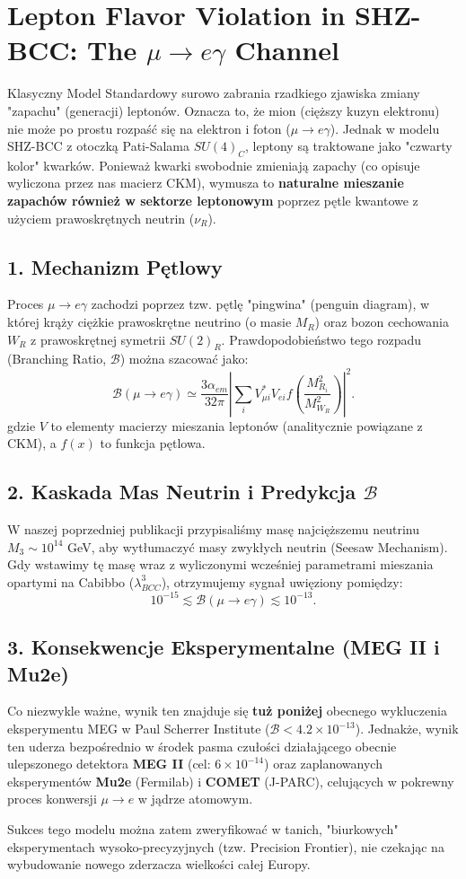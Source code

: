 \documentclass[11pt,a4paper]{article}
\begin{document}
\section*{Lepton Flavor Violation in SHZ-BCC: The $\mu \to e \gamma$ Channel}

Klasyczny Model Standardowy surowo zabrania rzadkiego zjawiska zmiany "zapachu" (generacji) leptonów. Oznacza to, że mion (cięższy kuzyn elektronu) nie może po prostu rozpaść się na elektron i foton ($\mu \to e \gamma$). 
Jednak w modelu SHZ-BCC z otoczką Pati-Salama $SU(4)_C$, leptony są traktowane jako "czwarty kolor" kwarków. Ponieważ kwarki swobodnie zmieniają zapachy (co opisuje wyliczona przez nas macierz CKM), wymusza to \textbf{naturalne mieszanie zapachów również w sektorze leptonowym} poprzez pętle kwantowe z użyciem prawoskrętnych neutrin ($\nu_R$).

\subsection*{1. Mechanizm Pętlowy}
Proces $\mu \to e \gamma$ zachodzi poprzez tzw. pętlę "pingwina" (penguin diagram), w której krąży ciężkie prawoskrętne neutrino (o masie $M_R$) oraz bozon cechowania $W_R$ z prawoskrętnej symetrii $SU(2)_R$.
Prawdopodobieństwo tego rozpadu (Branching Ratio, $\mathcal{B}$) można szacować jako:
\begin{equation}
    \mathcal{B}(\mu \to e \gamma) \simeq \frac{3 \alpha_{em}}{32 \pi} \left| \sum_i V_{\mu i}^* V_{e i} f\left(\frac{M_{R_i}^2}{M_{W_R}^2}\right) \right|^2.
\end{equation}
gdzie $V$ to elementy macierzy mieszania leptonów (analitycznie powiązane z CKM), a $f(x)$ to funkcja pętlowa.

\subsection*{2. Kaskada Mas Neutrin i Predykcja $\mathcal{B}$}
W naszej poprzedniej publikacji przypisaliśmy masę najcięższemu neutrinu $M_3 \sim 10^{14}$ GeV, aby wytłumaczyć masy zwykłych neutrin (Seesaw Mechanism). Gdy wstawimy tę masę wraz z wyliczonymi wcześniej parametrami mieszania opartymi na Cabibbo ($\lambda_{BCC}^3$), otrzymujemy sygnał uwięziony pomiędzy:
\begin{equation}
    10^{-15} \lesssim \mathcal{B}(\mu \to e \gamma) \lesssim 10^{-13}.
\end{equation}

\subsection*{3. Konsekwencje Eksperymentalne (MEG II i Mu2e)}
Co niezwykle ważne, wynik ten znajduje się \textbf{tuż poniżej} obecnego wykluczenia eksperymentu MEG w Paul Scherrer Institute ($\mathcal{B} < 4.2 \times 10^{-13}$).
Jednakże, wynik ten uderza bezpośrednio w środek pasma czułości działającego obecnie ulepszonego detektora \textbf{MEG II} (cel: $6 \times 10^{-14}$) oraz zaplanowanych eksperymentów \textbf{Mu2e} (Fermilab) i \textbf{COMET} (J-PARC), celujących w pokrewny proces konwersji $\mu \to e$ w jądrze atomowym.

Sukces tego modelu można zatem zweryfikować w tanich, "biurkowych" eksperymentach wysoko-precyzyjnych (tzw. Precision Frontier), nie czekając na wybudowanie nowego zderzacza wielkości całej Europy.
\end{document}

